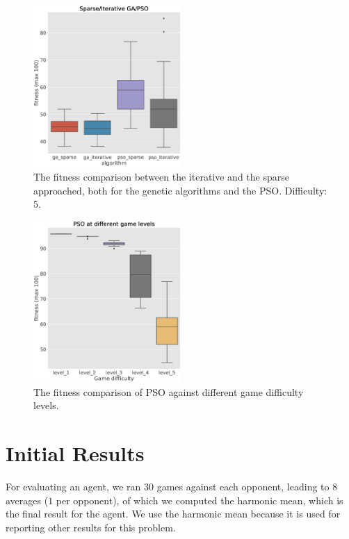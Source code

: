 \documentclass[conference]{IEEEtran}
\begin{document}
    \pagebreak

    \begin{figure}[!ht]
        \centering
        \includegraphics[width=0.5\textwidth]{old_images/overview.eps}
        \caption{The fitness comparison between the iterative and the sparse approached,
        both for the genetic algorithms and the PSO.  Difficulty: $5$.}
        \label{fig:overview}
    \end{figure}

    \begin{figure}[!ht]
        \centering
        \includegraphics[width=0.5\textwidth]{old_images/pso_levels.eps}
        \caption{The fitness comparison of PSO against different game difficulty levels.}
        \label{fig:pso_levels}
    \end{figure}

    
    
    \section{Initial Results}\label{sec:results}
    For evaluating an agent, we ran $30$ games against each opponent,
    leading to $8$ averages ($1$ per opponent), of which we computed the harmonic mean,
    which is the final result for the agent.
    We use the harmonic mean because it is used for reporting other results for this problem\cite{evoman_competition}.
\end{document}
